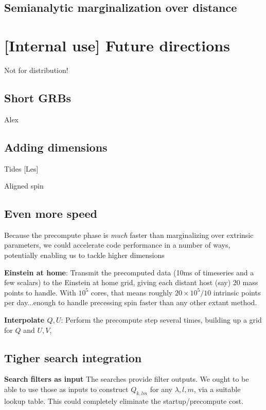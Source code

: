 \subsection{Semianalytic marginalization over distance}


\section{[Internal use] Future directions}

Not for distribution!

\subsection{Short GRBs}

Alex

\subsection{Adding dimensions}

Tides [Les]

Aligned spin

\subsection{Even more speed}

Because the precompute phase is \emph{much} faster than marginalizing over extrinsic parameters, we could accelerate
code performance in a number of ways, potentially enabling us to tackle higher dimensions

\noindent \textbf{Einstein at home}: Transmit the precomputed data (10ms of timeseries and a few scalars) to the
Einstein at home grid, giving each distant host (say) 20 mass points to handle.  With $10^5$ cores, that means roughly
$20\times10^5/10$ intrinsic points per day...enough to handle precessing spin faster than any other extant method.

\noindent \textbf{Interpolate $Q,U$}: Perform the precompute step several times, building up a grid for $Q$ and $U,V$,

\subsection{Tigher search integration}


\noindent \textbf{Search filters as input}
The searches provide filter outputs.  We ought to be able to use those as inputs to construct $Q_{k,lm}$ for any
$\lambda,l,m$, via a suitable lookup table.   This could completely eliminate the startup/precompute cost.



